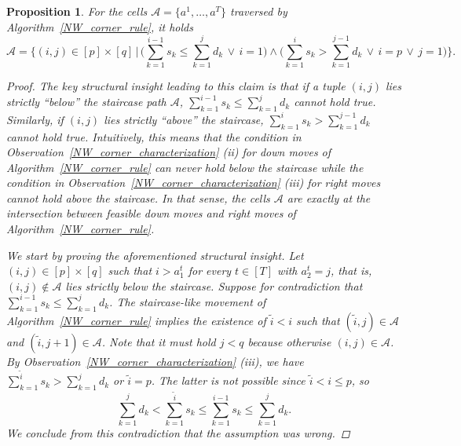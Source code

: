 \documentclass[letterpaper]{article}
\newtheorem{proposition}[theorem]{Proposition}
\begin{document}
\begin{proposition}\label{NW_corner_characterization_2}
    For the cells $\mathcal{A} = \{a^1, \dots, a^T\}$ traversed by Algorithm~\ref{NW_corner_rule}, it holds
    \begin{equation}
        \mathcal{A} = \bigg\{(i,j) \in [p] \times [q] \, \bigg| \, \bigg( \sum_{k=1}^{i-1} s_k \leq \sum_{k=1}^{j} d_k \, \lor \, i = 1 \bigg) \land \bigg( \sum_{k=1}^{i} s_k > \sum_{k=1}^{j-1} d_k \, \lor \, i = p \, \lor \, j = 1 \bigg) \bigg\}. \label{NW_characterization_equation}
    \end{equation}
    \begin{proof}
        The key structural insight leading to this claim is that if a tuple $(i, j)$ lies strictly \enquote{below} the staircase path $\mathcal{A}$, $\sum_{k=1}^{i-1} s_k \leq \sum_{k=1}^{j} d_k$ \textit{cannot} hold true. Similarly, if $(i, j)$ lies strictly \enquote{above} the staircase, $\sum_{k=1}^{i} s_k > \sum_{k=1}^{j-1} d_k$ \textit{cannot} hold true. Intuitively, this means that the condition in Observation~\ref{NW_corner_characterization} \textit{(ii)} for down moves of Algorithm~\ref{NW_corner_rule} can never hold below the staircase while the condition in Observation~\ref{NW_corner_characterization} \textit{(iii)} for right moves cannot hold above the staircase. In that sense, the cells $\mathcal{A}$ are exactly at the intersection between feasible down moves and right moves of Algorithm~\ref{NW_corner_rule}.

        We start by proving the aforementioned structural insight. Let $(i, j) \in [p] \times [q]$ such that $i > a_1^t$ for every $t \in [T]$ with $a_2^t = j$, that is, $(i, j) \notin \mathcal{A}$ lies strictly below the staircase. Suppose for contradiction that $\sum_{k=1}^{i-1} s_k \leq \sum_{k=1}^{j} d_k$. The staircase-like movement of Algorithm~\ref{NW_corner_rule} implies the existence of $\tilde{i} < i$ such that $(\tilde{i}, j) \in \mathcal{A}$ and $(\tilde{i}, j+1) \in \mathcal{A}$. Note that it must hold $j < q$ because otherwise $(i, j) \in \mathcal{A}$. By Observation~\ref{NW_corner_characterization} \textit{(iii)}, we have $\sum_{k=1}^{\tilde{i}} s_k > \sum_{k=1}^{j} d_k$ or $\tilde{i} = p$. The latter is not possible since $\tilde{i} < i \leq p$, so
        \begin{equation*}
            \sum_{k=1}^{j} d_k < \sum_{k=1}^{\tilde{i}} s_k \leq \sum_{k=1}^{i-1} s_k \leq \sum_{k=1}^{j} d_k.
        \end{equation*}
        We conclude from this contradiction that the assumption was wrong.


\end{proof}
\end{proposition}
\end{document}
